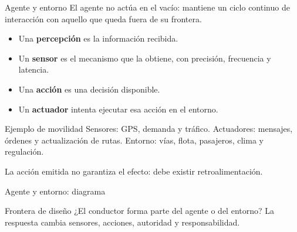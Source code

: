 \documentclass[aspectratio=169,11pt]{beamer}
\newcommand{\concepto}[1]{\textcolor{UAPTeal}{\textbf{#1}}}
\begin{document}
\begin{frame}{Agente y entorno}
  El agente no actúa en el vacío: mantiene un ciclo continuo de interacción con aquello que queda fuera de su frontera.
  \begin{itemize}
    \item Una \concepto{percepción} es la información recibida.
    \item Un \concepto{sensor} es el mecanismo que la obtiene, con precisión, frecuencia y latencia.
    \item Una \concepto{acción} es una decisión disponible.
    \item Un \concepto{actuador} intenta ejecutar esa acción en el entorno.
  \end{itemize}
  \begin{block}{Ejemplo de movilidad}
    Sensores: GPS, demanda y tráfico. Actuadores: mensajes, órdenes y actualización de rutas. Entorno: vías, flota, pasajeros, clima y regulación.
  \end{block}
  \alert{La acción emitida no garantiza el efecto: debe existir retroalimentación.}
\end{frame}

\begin{frame}{Agente y entorno: diagrama}
  \centering
  \vfill
  \begin{block}{Frontera de diseño}
    ¿El conductor forma parte del agente o del entorno? La respuesta cambia sensores, acciones, autoridad y responsabilidad.
  \end{block}
\end{frame}
\end{document}
